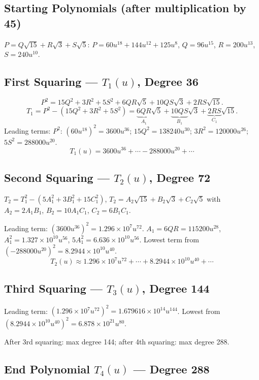 \subsection{Starting Polynomials (after multiplication by 45)}

$P=Q\sqrt{15}+R\sqrt{3}+S\sqrt{5}$:
$P=60u^{18}+144u^{12}+125u^8$,
$Q=96u^{15}$, $R=200u^{13}$, $S=240u^{10}$.

\subsection{First Squaring --- $T_1(u)$, Degree 36}

\[
  P^2 = 15Q^2+3R^2+5S^2+6QR\sqrt{5}+10QS\sqrt{3}+2RS\sqrt{15}.
\]
\[
  T_1 = P^2-(15Q^2+3R^2+5S^2)
  = \underbrace{6QR}_{A_1}\sqrt{5}+\underbrace{10QS}_{B_1}\sqrt{3}
  +\underbrace{2RS}_{C_1}\sqrt{15}.
\]
Leading terms:
$P^2$: $(60u^{18})^2=3600u^{36}$;
$15Q^2=138240u^{30}$;
$3R^2=120000u^{26}$;
$5S^2=288000u^{20}$.
\[
  T_1(u)=3600u^{36}+\cdots-288000u^{20}+\cdots
\]

\subsection{Second Squaring --- $T_2(u)$, Degree 72}

$T_2=T_1^2-(5A_1^2+3B_1^2+15C_1^2)$,
$T_2=A_2\sqrt{15}+B_2\sqrt{3}+C_2\sqrt{5}$
with $A_2=2A_1B_1$, $B_2=10A_1C_1$, $C_2=6B_1C_1$.

Leading term: $(3600u^{36})^2=1.296\times10^7u^{72}$.
$A_1=6QR=115200u^{28}$,
$A_1^2=1.327\times10^{10}u^{56}$,
$5A_1^2=6.636\times10^{10}u^{56}$.
Lowest term from $(-288000u^{20})^2=8.2944\times10^{10}u^{40}$.
\[
  T_2(u)\approx1.296\times10^7u^{72}+\cdots+8.2944\times10^{10}u^{40}+\cdots
\]

\subsection{Third Squaring --- $T_3(u)$, Degree 144}

Leading term: $(1.296\times10^7u^{72})^2=1.679616\times10^{14}u^{144}$.
Lowest from $(8.2944\times10^{10}u^{40})^2=6.878\times10^{21}u^{80}$.

After 3rd squaring: max degree 144; after 4th squaring: max degree 288.

\subsection{End Polynomial $T_4(u)$ --- Degree 288}

